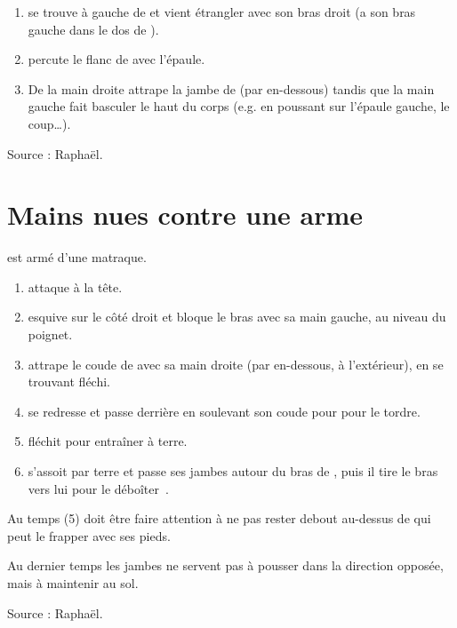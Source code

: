 \begin{technique}

\begin{enumerate}
	\item \A se trouve à gauche de \D et vient étrangler avec son bras droit (\D a son bras gauche dans le dos de \A).
	
	\item \D percute le flanc de \A avec l'épaule.
	
	\item De la main droite \D attrape la jambe de \A (par en-dessous) tandis que la main gauche fait basculer le haut du corps (e.g. en poussant sur l'épaule gauche, le coup…). 
\end{enumerate}

Source : Raphaël.

\end{technique}


\section{Mains nues contre une arme}


\begin{technique}

\A est armé d'une matraque.

\begin{enumerate}
	\item \A attaque \D à la tête.
	
	\item \D esquive sur le côté droit et bloque le bras avec sa main gauche, au niveau du poignet.
	
	\item \D attrape le coude de \A avec sa main droite (par en-dessous, à l'extérieur), en se trouvant fléchi.
	
	\item \D se redresse et passe derrière \A en soulevant son coude pour pour le tordre.
	
	\item \D fléchit pour entraîner \A à terre.
	
	\item \D s'assoit par terre et passe ses jambes autour du bras de \A, puis il tire le bras vers lui pour le déboîter~\footnotemark.
\end{enumerate}

Au temps (5) \D doit être faire attention à ne pas rester debout au-dessus de \A qui peut le frapper avec ses pieds.

Au dernier temps les jambes ne servent pas à pousser dans la direction opposée, mais à maintenir \A au sol.

Source : Raphaël.

\end{technique}


